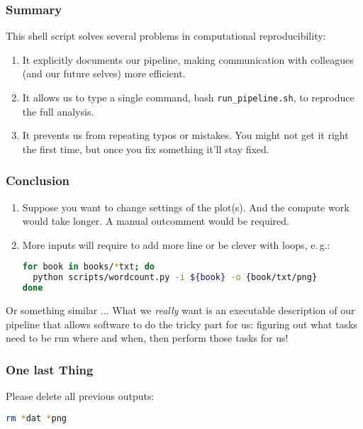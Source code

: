 \begin{frame}
  \frametitle{Summary}
  This  shell script solves several problems in computational reproducibility:
  \begin{enumerate}[<+->]
   \item It explicitly documents our pipeline, making communication with colleagues (and our future selves) more efficient.
   \item It allows us to type a single command, bash \texttt{run\_pipeline.sh}, to reproduce the full analysis.
   \item It prevents us from repeating typos or mistakes. You might not get it right the first time, but once you fix something it’ll stay fixed.
  \end{enumerate}
  \pause
\end{frame}

\begin{frame}[fragile]
  \frametitle{Conclusion}
  \begin{enumerate}[<+->]
   \item Suppose you want to change settings of the plot(s). And the compute work would take longer. A manual outcomment would be required.
   \item More inputs will require to add more line or be clever with loops, e.\,g.:
         \begin{lstlisting}[language=Bash, style=Shell]
for book in books/*txt; do 
  python scripts/wordcount.py -i ${book} -o {book/txt/png}
done
         \end{lstlisting}
  \end{enumerate}
  Or something similar ...\newline
  What we \emph{really} want is an executable description of our pipeline that allows software to do the tricky part for us: figuring out what tasks need to be run where and when, then perform those tasks for us!
\end{frame}

\begin{frame}[fragile]
  \frametitle{One last Thing}
  Please delete all previous outputs:
  \begin{lstlisting}[language=Bash, style=Shell]
rm *dat *png 
  \end{lstlisting}
\end{frame}




